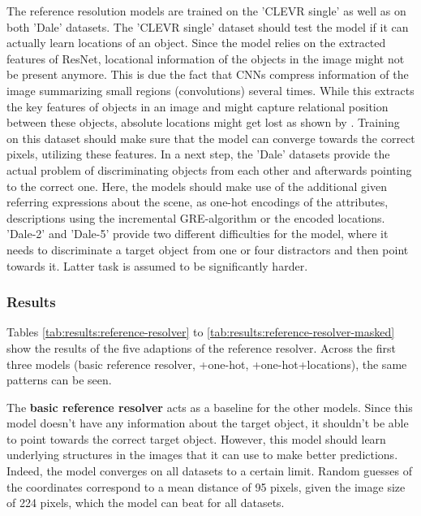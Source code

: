 The reference resolution models are trained on the 'CLEVR single' as well as on both 'Dale' datasets.
The 'CLEVR single' dataset should test the model if it can actually learn locations of an object.
Since the model relies on the extracted features of ResNet, locational information of the objects in the image might not be present anymore.
This is due the fact that CNNs compress information of the image summarizing small regions (convolutions) several times.
While this extracts the key features of objects in an image and might capture relational position between these objects, absolute locations might get lost as shown by \citet{Kelleher2017}.
Training on this dataset should make sure that the model can converge towards the correct pixels, utilizing these features.
In a next step, the 'Dale' datasets provide the actual problem of discriminating objects from each other and afterwards pointing to the correct one.
Here, the models should make use of the additional given referring expressions about the scene, as one-hot encodings of the attributes, descriptions using the incremental GRE-algorithm or the encoded locations.
'Dale-2' and 'Dale-5' provide two different difficulties for the model, where it needs to discriminate a target object from one or four distractors and then point towards it.
Latter task is assumed to be significantly harder.

\subsubsection*{Results}
Tables \ref{tab:results:reference-resolver} to \ref{tab:results:reference-resolver-masked} show the results of the five adaptions of the reference resolver.
Across the first three models (basic reference resolver, +one-hot, +one-hot+locations), the same patterns can be seen.

The \textbf{basic reference resolver} acts as a baseline for the other models.
Since this model doesn't have any information about the target object, it shouldn't be able to point towards the correct target object.
However, this model should learn underlying structures in the images that it can use to make better predictions.
Indeed, the model converges on all datasets to a certain limit.
Random guesses of the coordinates correspond to a mean distance of 95 pixels, given the image size of 224 pixels, which the model can beat for all datasets.

